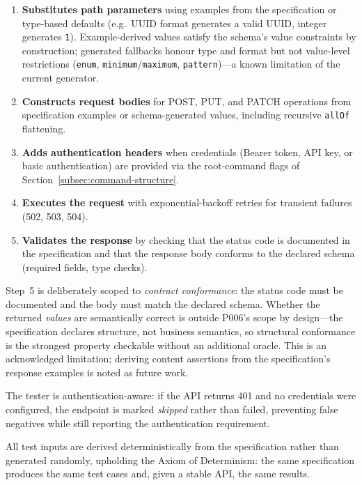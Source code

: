 \begin{enumerate}
    \item \textbf{Substitutes path parameters} using examples from the specification or type-based defaults (e.g.\ UUID format generates a valid UUID, integer generates \texttt{1}). Example-derived values satisfy the schema's value constraints by construction; generated fallbacks honour type and format but not value-level restrictions (\texttt{enum}, \texttt{minimum}/\texttt{maximum}, \texttt{pattern})---a known limitation of the current generator.
    \item \textbf{Constructs request bodies} for POST, PUT, and PATCH operations from specification examples or schema-generated values, including recursive \texttt{allOf} flattening.
    \item \textbf{Adds authentication headers} when credentials (Bearer token, API key, or basic authentication) are provided via the root-command flags of Section~\ref{subsec:command-structure}.
    \item \textbf{Executes the request} with exponential-backoff retries for transient failures (502, 503, 504).
    \item \textbf{Validates the response} by checking that the status code is documented in the specification and that the response body conforms to the declared schema (required fields, type checks).
\end{enumerate}

Step~5 is deliberately scoped to \emph{contract conformance}: the status code must be documented and the body must match the declared schema. Whether the returned \emph{values} are semantically correct is outside P006's scope by design---the specification declares structure, not business semantics, so structural conformance is the strongest property checkable without an additional oracle. This is an acknowledged limitation; deriving content assertions from the specification's response examples is noted as future work.

The tester is authentication-aware: if the API returns 401 and no credentials were configured, the endpoint is marked \textit{skipped} rather than failed, preventing false negatives while still reporting the authentication requirement.

All test inputs are derived deterministically from the specification rather than generated randomly, upholding the Axiom of Determinism: the same specification produces the same test cases and, given a stable API, the same results.

